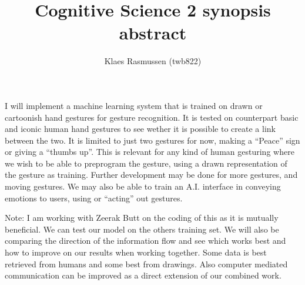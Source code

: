 \documentclass[11pt,a4paper]{article}
\begin{document}
\title{Cognitive Science 2 synopsis abstract}
\author{Klaes Rasmussen (twb822)}
\date{}
\maketitle

I will implement a machine learning system that is trained on drawn or cartoonish hand gestures for gesture recognition. It is tested on counterpart basic and iconic human hand gestures to see wether it is possible to create a link between the two. It is limited to just two gestures for now, making a ``Peace'' sign or giving a ``thumbs up''. This is relevant for any kind of human gesturing where we wish to be able to preprogram the gesture, using a drawn representation of the gesture as training. Further development may be done for more gestures, and moving gestures. We may also be able to train an A.I. interface in conveying emotions to users, using or ``acting'' out gestures.

\vspace{1.5pc}

Note: I am working with Zeerak Butt on the coding of this as it is mutually beneficial. We can test our model on the others training set. We will also be comparing the direction of the information flow and see which works best and how to improve on our results when working together. Some data is best retrieved from humans and some best from drawings. Also computer mediated communication can be improved as a direct extension of our combined work.



\nocite{*}
\end{document}
